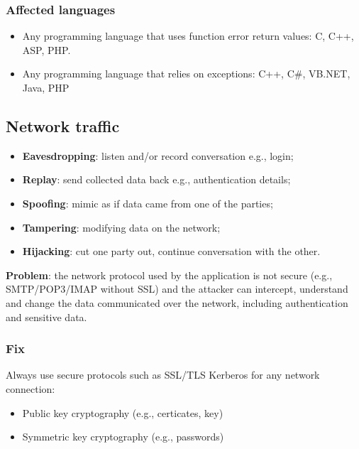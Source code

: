 \documentclass[a4paper, 10pt, titlepage]{article}
\begin{document}
\subsubsection*{Affected languages}
\begin{itemize}
\item Any programming language that uses function error return values: C, C++, ASP, PHP. 
\item Any programming language that relies on exceptions: C++, C\#, VB.NET, Java, PHP
\end{itemize}


\newpage
\subsection{Network traffic}
\begin{itemize}
\item \textbf{Eavesdropping}: listen and/or record conversation e.g., login;
\item \textbf{Replay}: send collected data back e.g., authentication details;
\item \textbf{Spoofing}: mimic as if data came from one of the parties;
\item \textbf{Tampering}: modifying data on the network;
\item \textbf{Hijacking}: cut one party out, continue conversation with the other.
\end{itemize}
\textbf{Problem}: the network protocol used by the application is not secure (e.g., SMTP/POP3/IMAP without SSL) and the attacker can intercept, understand and change the data communicated over the network, including authentication and sensitive data.

\subsubsection*{Fix}
Always use secure protocols such as SSL/TLS Kerberos for any network connection:
\begin{itemize}
\item Public key cryptography (e.g., certicates, key)
\item Symmetric key cryptography (e.g., passwords)
\end{itemize}
\end{document}
